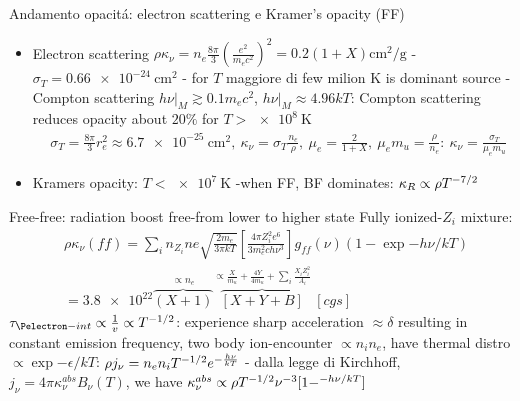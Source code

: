 \begin{frame}{Andamento opacit\'a: electron scattering e Kramer's opacity (FF)}
\begin{itemize}
\item Electron scattering $\rho\kappa_{\nu}=n_e\frac{8\pi}{3}(\frac{e^2}{m_ec^2})^2=0.2(1+X)\si{\square\cm\per\gram}$ - $\sigma_T=\SI{0.66e-24}{\square\cm}$ - for $T$ maggiore di few milion K is dominant source - Compton scattering $h\nu|_M\gtrsim0.1 m_ec^2$, $h\nu|_M\approx4.96kT$: Compton scattering reduces opacity about $20\%$ for $T>\SI{e8}{\kelvin}$
    \begin{align*}
        &\sigma_T=\frac{8\pi}{3}r_e^2\approx\SI{6.7e-25}{\square\cm},\ \kappa_{\nu}=\sigma_T \frac{n_e}{\rho},\ \mu_e=\frac{2}{1+X},\ \mu_em_u=\frac{\rho}{n_e}:\ \kappa_{\nu}=\frac{\sigma_T}{\mu_em_u}
    \end{align*}
\item Kramers opacity: $T<\SI{e7}{\kelvin}$ -when FF, BF dominates: $\kappa_R\propto\rho T^{-7/2}$
\end{itemize}
\begin{block}{Free-free: radiation boost free-\Pelectron from lower to higher state}
Fully ionized-$Z_i$ mixture: 
\begin{align*}
&\rho\kappa_{\nu}(ff)=\sum_in_{Z_i}ne\sqrt{\frac{2m_e}{3\pi kT}}[\frac{4\pi Z_i^2e^6}{3m_e^2ch\nu^3}]g_{ff}(\nu)(1-\exp{-h\nu/kT})\\
&=\num{3.8e22}\overbrace{(X+1)}^{\propto n_e}\overbrace{[X+Y+B]}^{\propto\frac{X}{m_u}+\frac{4Y}{4m_u}+\sum_i\frac{X_iZ_i^2}{A_i}}\ [\si{cgs}]
\end{align*}
$\tau_{\Pelectron-int}\propto\frac{1}{v}\propto T\expy{-1/2}$: \Pelectron experience sharp acceleration $\approx\delta$ resulting in constant emission frequency, two body ion-\Pelectron encounter $\propto n_in_e$, \Pelectron have thermal distro $\propto\exp{-\epsilon/kT}$: $\rho j_{\nu}=n_en_iT^{-1/2}e^{-\frac{h\nu}{kT}}$ - dalla legge di Kirchhoff, $j_{\nu}=4\pi\kappa_{\nu}^{abs}B_{\nu}(T)$, we have $\kappa_{\nu}^{abs}\propto\rho T^{-1/2}\nu^{-3}[1-^{-h\nu/kT}]$
\end{block}
\end{frame}

